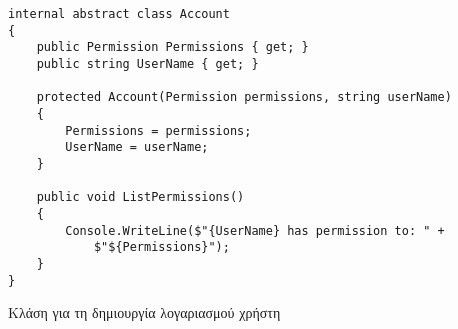 \begin{listing}[H]
\begin{verbatim}
internal abstract class Account
{
    public Permission Permissions { get; }
    public string UserName { get; }

    protected Account(Permission permissions, string userName)
    {
        Permissions = permissions;
        UserName = userName;
    }

    public void ListPermissions()
    {
        Console.WriteLine($"{UserName} has permission to: " +
            $"${Permissions}");
    }
}
\end{verbatim}
\caption{Κλάση για τη δημιουργία λογαριασμού χρήστη}
\label{flagsMainClass}
\end{listing}